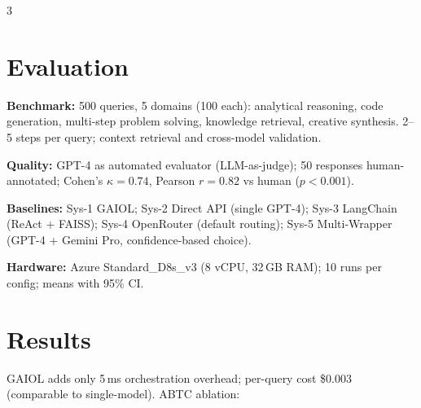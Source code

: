 \documentclass[14pt]{article}
\begin{document}
\begin{multicols}{3}
\section*{Evaluation}
\textbf{Benchmark:} 500 queries, 5 domains (100 each): analytical reasoning, code generation, multi-step problem solving, knowledge retrieval, creative synthesis. 2--5 steps per query; context retrieval and cross-model validation.

\textbf{Quality:} GPT-4 as automated evaluator (LLM-as-judge); 50 responses human-annotated; Cohen's $\kappa = 0.74$, Pearson $r = 0.82$ vs human ($p < 0.001$).

\textbf{Baselines:} Sys-1 GAIOL; Sys-2 Direct API (single GPT-4); Sys-3 LangChain (ReAct + FAISS); Sys-4 OpenRouter (default routing); Sys-5 Multi-Wrapper (GPT-4 + Gemini Pro, confidence-based choice).

\textbf{Hardware:} Azure Standard\_D8s\_v3 (8 vCPU, 32\,GB RAM); 10 runs per config; means with 95\% CI.

\section*{Results}
\begin{center}
\small
{}
\end{center}

GAIOL adds only 5\,ms orchestration overhead; per-query cost \$0.003 (comparable to single-model). ABTC ablation:

\begin{center}
\small
{}
\end{center}


\end{multicols}
\end{document}

